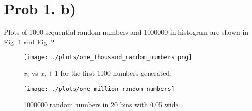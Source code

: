 \section{Prob 1. b)}

Plots of 1000 sequential random numbers and 1000000 in histogram are shown in Fig. \ref{fig:fig1} and Fig. \ref{fig:fig2}.



\begin{figure}[ht!]
  \centering
  \texttt{[image: ./plots/one\_thousand\_random\_numbers.png]}
  \caption{$x_i$ vs $x_i+1$ for the first 1000 numbers generated.}
  \label{fig:fig1}
\end{figure}

\begin{figure}[ht!]
  \centering
  \texttt{[image: ./plots/one\_million\_random\_numbers]}
  \caption{1000000 random numbers in 20 bins with 0.05 wide.}
  \label{fig:fig2}
\end{figure}
